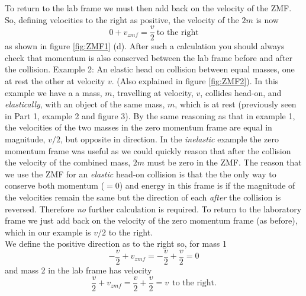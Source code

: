 \noindent To return to the lab frame we must then add back on the velocity of the ZMF. So, defining velocities to the right as positive, the velocity of the $2m$ is now
\begin{equation}
0+v_{zmf}=\frac{v}{2} \ \mbox{to the right}
\end{equation}
as shown in figure \ref{fig:ZMF1} (d).  After such a calculation you should always check that momentum is also conserved between the lab frame before and after the collision. 
\nll
Example 2: An elastic head on collision between equal masses, one at rest the other at velocity $v$. (Also explained in figure \ref{fig:ZMF2}).
\nll
In this example we have a a mass, $m$, travelling at velocity, $v$, collides head-on, and \emph{elastically}, with an object of the same mass, $m$, which is at rest (previously seen in Part 1, example 2 and figure 3).
\nll
By the same reasoning as that in example 1, the velocities of the two masses in the zero momentum frame are equal in magnitude, $v/2$, but opposite in direction.  In the \emph{inelastic} example the zero momentum frame was useful as we could quickly reason that after the collision the velocity of the combined mass, $2m$ must be zero in the ZMF.  The reason that we use the ZMF for an \emph{elastic} head-on collision is that the the only way to conserve both momentum ($=0$) and energy in this frame is if the magnitude of the velocities remain the same but the direction of each \emph{after} the collision is reversed.  Therefore \emph{no} further calculation is required.
\nll
To return to the laboratory frame we just add back on the velocity of the zero momentum frame (as before), which in our example is $v/2$ to the right. \\
\noindent We define the positive direction as to the right so, for mass 1
\begin{equation}
-\frac{v}{2}+v_{zmf}=-\frac{v}{2}+\frac{v}{2}=0
\end{equation}
and mass 2 in the lab frame has velocity
\begin{equation}
\frac{v}{2}+v_{zmf}=\frac{v}{2}+\frac{v}{2} =v\ \  \mbox{to the right}.
\end{equation}

